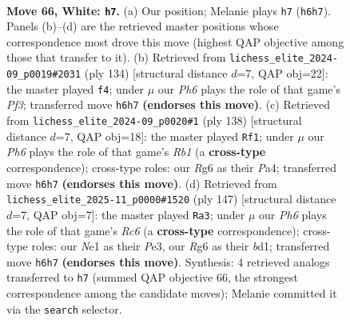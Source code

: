 \documentclass[11pt]{article}
\begin{document}
\clearpage

\begin{figure}[p]\centering
\begin{subfigure}{0.46\textwidth}\centering
\resizebox{\linewidth}{!}{%
\newchessgame
\chessboard[
  setfen={8/8/6RP/8/8/8/5K2/3kN3 w - - 1 66},
  showmover=false,
  pgfstyle=straightmove, color=movearrow, markmove={h6-h7}
]}
\caption{}
\end{subfigure}\hfill
\begin{subfigure}{0.46\textwidth}\centering
\resizebox{\linewidth}{!}{%
\newchessgame
\chessboard[
  setfen={8/8/8/4K3/4N3/3k1P2/5R2/8 w - - 1 68},
  showmover=false,
  pgfstyle=straightmove, color=movearrow, markmove={f3-f4}
]}
\caption{}
\end{subfigure}
\\[4pt]
\begin{subfigure}{0.46\textwidth}\centering
\resizebox{\linewidth}{!}{%
\newchessgame
\chessboard[
  setfen={8/3K3N/6k1/8/P7/8/8/1R6 w - - 2 70},
  showmover=false,
  pgfstyle=straightmove, color=movearrow, markmove={b1-f1}
]}
\caption{}
\end{subfigure}\hfill
\begin{subfigure}{0.46\textwidth}\centering
\resizebox{\linewidth}{!}{%
\newchessgame
\chessboard[
  setfen={8/8/3k4/8/4K3/2r1p3/8/3B4 b - - 9 74},
  showmover=false,
  pgfstyle=straightmove, color=movearrow, markmove={c3-a3}
]}
\caption{}
\end{subfigure}
\caption{\textbf{Move 66, White: \texttt{h7}.} (a) Our position; Melanie plays \texttt{h7} (\texttt{h6h7}). Panels (b)--(d) are the retrieved master positions whose correspondence most drove this move (highest QAP objective among those that transfer to it). (b) Retrieved from \texttt{lichess\_elite\_2024-09\_p0019\#2031} (ply 134) [structural distance $d$=7, QAP obj=22]: the master played \texttt{f4}; under $\mu$ our \emph{Ph6} plays the role of that game's \emph{Pf3}; transferred move \texttt{h6h7} \textbf{(endorses this move)}. (c) Retrieved from \texttt{lichess\_elite\_2024-09\_p0020\#1} (ply 138) [structural distance $d$=7, QAP obj=18]: the master played \texttt{Rf1}; under $\mu$ our \emph{Ph6} plays the role of that game's \emph{Rb1} (a \textbf{cross-type} correspondence); cross-type roles: our \emph{R}g6 as their \emph{P}a4; transferred move \texttt{h6h7} \textbf{(endorses this move)}. (d) Retrieved from \texttt{lichess\_elite\_2025-11\_p0000\#1520} (ply 147) [structural distance $d$=7, QAP obj=7]: the master played \texttt{Ra3}; under $\mu$ our \emph{Ph6} plays the role of that game's \emph{Rc6} (a \textbf{cross-type} correspondence); cross-type roles: our \emph{N}e1 as their \emph{P}e3, our \emph{R}g6 as their \emph{b}d1; transferred move \texttt{h6h7} \textbf{(endorses this move)}. Synthesis: 4 retrieved analogs transferred to \texttt{h7} (summed QAP objective 66, the strongest correspondence among the candidate moves); Melanie committed it via the \texttt{search} selector.}
\label{fig:thought-m130}
\end{figure}
\end{document}
